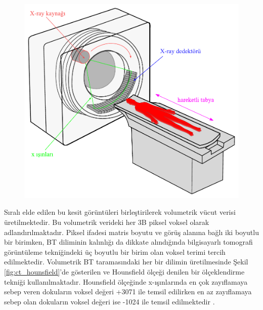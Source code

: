 \begin{figure}[h!]
	\begin{center}
		\vspace{0.4cm}
		{
			\vspace{0.4cm}
			\includegraphics[scale=0.68]{Genel-Bilgiler/Figures/ct_block.pdf}
		}
	\end{center}
\end{figure}

Sıralı elde edilen bu kesit görüntüleri birleştirilerek volumetrik vücut verisi üretilmektedir. Bu volumetrik verideki her 3B piksel voksel olarak adlandırılmaktadır. Piksel ifadesi matris boyutu ve görüş alanına bağlı iki boyutlu bir birimken, BT diliminin kalınlığı da dikkate alındığında bilgisayarlı tomografi görüntüleme tekniğindeki üç boyutlu bir birim olan voksel terimi tercih edilmektedir. Volumetrik BT taramasındaki her bir dilimin üretilmesinde Şekil \ref{fig:ct_hounsfield}'de gösterilen ve Hounsfield ölçeği denilen bir ölçeklendirme tekniği kullanılmaktadır. Hounsfield ölçeğinde x-ışınlarında en çok zayıflamaya sebep veren dokuların voksel değeri +3071 ile temsil edilirken en az zayıflamaya sebep olan dokuların voksel değeri ise -1024 ile temsil edilmektedir \cite{hounsfield1973computerized}.

